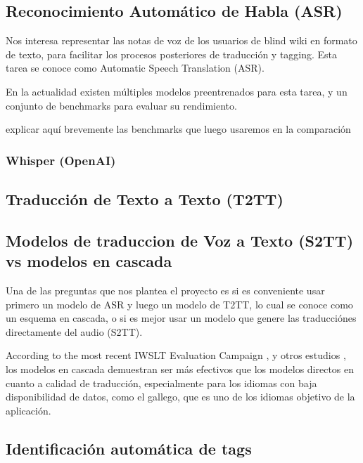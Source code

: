 \subsection{Reconocimiento Automático de Habla (ASR)}
Nos interesa representar las notas de voz de los usuarios de blind wiki en formato de texto, para facilitar los procesos posteriores de traducción y tagging. Esta tarea se conoce como Automatic Speech Translation (ASR).

En la actualidad existen múltiples modelos preentrenados para esta tarea, y un conjunto de benchmarks para evaluar su rendimiento.

explicar aquí brevemente las benchmarks que luego usaremos en la comparación

\subsubsection{Whisper (OpenAI)}


\subsection{Traducción de Texto a Texto (T2TT)}

\subsection{Modelos de traduccion de Voz a Texto (S2TT) vs modelos en cascada}
Una de las preguntas que nos plantea el proyecto es si es conveniente usar primero un modelo de ASR y luego un modelo de T2TT, lo cual se conoce como un esquema en cascada, o si es mejor usar un modelo que genere las traducciónes directamente del audio (S2TT).

According to the most recent IWSLT Evaluation Campaign \cite{iwslt-findings}, y otros estudios \cite{etchegoyhen2022cascade} \cite{Sethiya2025}, los modelos en cascada demuestran ser más efectivos que los modelos directos en cuanto a calidad de traducción, especialmente para los idiomas con baja disponibilidad de datos, como el gallego, que es uno de los idiomas objetivo de la aplicación.

\subsection{Identificación automática de tags}


